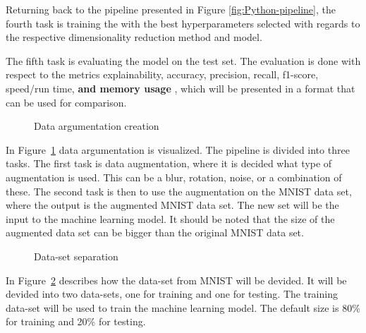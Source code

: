 Returning back to the pipeline presented in Figure \ref{fig:Python-pipeline}, the fourth task is training the with the best hyperparameters selected with regards to the respective dimensionality reduction method and model.

The fifth task is evaluating the model on the test set. The evaluation is done with respect to the metrics explainability, accuracy, precision, recall, f1-score, speed/run time, \textbf{and memory usage} , which will be presented in a format that can be used for comparison.

\begin{figure}[htb!]
    \centering
    
    \caption{Data argumentation creation}
    \label{fig:data-argumentation-create}
\end{figure}


In Figure~\ref{fig:data-argumentation-create} data argumentation is visualized. The pipeline is divided into three tasks. The first task is data augmentation, where it is decided what type of augmentation is used. This can be a blur, rotation, noise, or a combination of these. The second task is then to use the augmentation on the MNIST data set, where the output is the augmented MNIST data set. The new set will be the input to the machine learning model. It should be noted that the size of the augmented data set can be bigger than the original MNIST data set.

\begin{figure}[htb!]
    \centering
    
    \caption{Data-set separation}
    \label{fig:data-set-sepa}
\end{figure}

In Figure~\ref{fig:data-set-sepa} describes how the data-set from MNIST will be devided. It will be devided into two data-sets, one for training and one for testing. The training data-set will be used to train the machine learning model. The default size is 80\% for training and 20\% for testing.